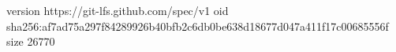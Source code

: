 version https://git-lfs.github.com/spec/v1
oid sha256:af7ad75a297f84289926b40bfb2c6db0be638d18677d047a411f17c00685556f
size 26770
